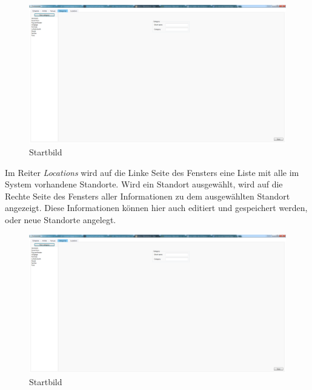\documentclass[12pt, a4paper]{article}
\begin{document}
\begin{figure}[h] 	
	\centering
		\includegraphics[width=1.0\textwidth]{CategoryWindow.png}
	\caption{Startbild}
\end{figure}
\clearpage 
Im Reiter \textit{Locations} wird auf die Linke Seite des Fensters eine Liste mit alle im System vorhandene Standorte. Wird ein Standort ausgewählt, wird auf die Rechte Seite des Fensters aller Informationen zu dem ausgewählten Standort angezeigt. Diese Informationen können hier auch editiert und gespeichert werden, oder neue Standorte angelegt.

\begin{figure}[h] 	
	\centering
		\includegraphics[width=1.0\textwidth]{LocationWindow.png}
	\caption{Startbild}
\end{figure}
\end{document}
